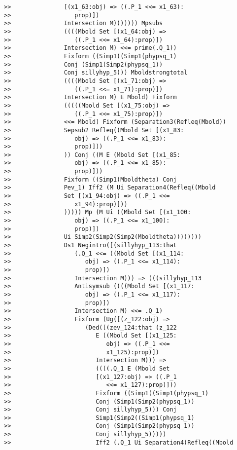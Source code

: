 \documentclass[12pt]{article}
\begin{document}
\begin{verbatim}
>>               [(x1_63:obj) => ((.P_1 <<= x1_63):
>>                  prop)])
>>               Intersection M))))))) Mpsubs
>>               ((((Mbold Set [(x1_64:obj) =>
>>                  ((.P_1 <<= x1_64):prop)])
>>               Intersection M) <<= prime(.Q_1))
>>               Fixform ((Simp1((Simp1(phypsq_1)
>>               Conj (Simp1(Simp2(phypsq_1))
>>               Conj sillyhyp_5))) Mboldstrongtotal
>>               ((((Mbold Set [(x1_71:obj) =>
>>                  ((.P_1 <<= x1_71):prop)])
>>               Intersection M) E Mbold) Fixform
>>               (((((Mbold Set [(x1_75:obj) =>
>>                  ((.P_1 <<= x1_75):prop)])
>>               <<= Mbold) Fixform (Separation3(Refleq(Mbold))
>>               Sepsub2 Refleq((Mbold Set [(x1_83:
>>                  obj) => ((.P_1 <<= x1_83):
>>                  prop)]))
>>               )) Conj ((M E (Mbold Set [(x1_85:
>>                  obj) => ((.P_1 <<= x1_85):
>>                  prop)]))
>>               Fixform ((Simp1(Mboldtheta) Conj
>>               Pev_1) Iff2 (M Ui Separation4(Refleq((Mbold
>>               Set [(x1_94:obj) => ((.P_1 <<=
>>                  x1_94):prop)]))
>>               ))))) Mp (M Ui ((Mbold Set [(x1_100:
>>                  obj) => ((.P_1 <<= x1_100):
>>                  prop)])
>>               Ui Simp2(Simp2(Simp2(Mboldtheta))))))))
>>               Ds1 Negintro([(sillyhyp_113:that
>>                  (.Q_1 <<= ((Mbold Set [(x1_114:
>>                     obj) => ((.P_1 <<= x1_114):
>>                     prop)])
>>                  Intersection M))) => (((sillyhyp_113
>>                  Antisymsub ((((Mbold Set [(x1_117:
>>                     obj) => ((.P_1 <<= x1_117):
>>                     prop)])
>>                  Intersection M) <<= .Q_1)
>>                  Fixform (Ug([(z_122:obj) =>
>>                     (Ded([(zev_124:that (z_122
>>                        E ((Mbold Set [(x1_125:
>>                           obj) => ((.P_1 <<=
>>                           x1_125):prop)])
>>                        Intersection M))) =>
>>                        ((((.Q_1 E (Mbold Set
>>                        [(x1_127:obj) => ((.P_1
>>                           <<= x1_127):prop)]))
>>                        Fixform ((Simp1((Simp1(phypsq_1)
>>                        Conj (Simp1(Simp2(phypsq_1))
>>                        Conj sillyhyp_5))) Conj
>>                        Simp1(Simp2((Simp1(phypsq_1)
>>                        Conj (Simp1(Simp2(phypsq_1))
>>                        Conj sillyhyp_5)))))
>>                        Iff2 (.Q_1 Ui Separation4(Refleq((Mbold

\end{verbatim}
\end{document}
